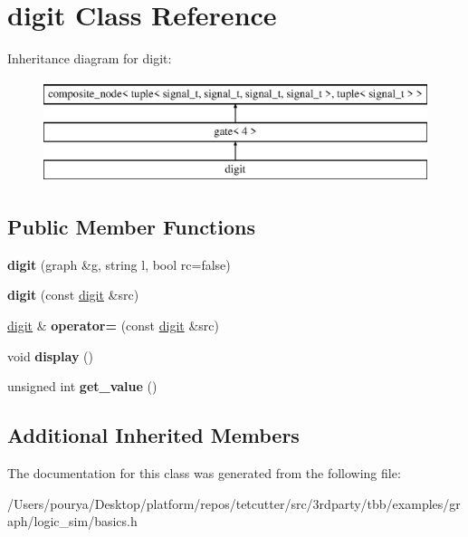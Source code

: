 \hypertarget{classdigit}{}\section{digit Class Reference}
\label{classdigit}
Inheritance diagram for digit\+:\begin{figure}[H]
\begin{center}
\leavevmode
\includegraphics[height=3.000000cm]{classdigit}
\end{center}
\end{figure}
\subsection*{Public Member Functions}
\begin{DoxyCompactItemize}
\item 
\hypertarget{classdigit_a689e30221c7eae6be4c044375d0c1164}{}{\bfseries digit} (graph \&g, string l, bool rc=false)\label{classdigit_a689e30221c7eae6be4c044375d0c1164}

\item 
\hypertarget{classdigit_ab341bade793ad14c1ccc996d095217fe}{}{\bfseries digit} (const \hyperlink{classdigit}{digit} \&src)\label{classdigit_ab341bade793ad14c1ccc996d095217fe}

\item 
\hypertarget{classdigit_af2720ef1255cc2ea17a3ad49184a9e5f}{}\hyperlink{classdigit}{digit} \& {\bfseries operator=} (const \hyperlink{classdigit}{digit} \&src)\label{classdigit_af2720ef1255cc2ea17a3ad49184a9e5f}

\item 
\hypertarget{classdigit_af516c63da92d0ae6c0a9f56349cc4f28}{}void {\bfseries display} ()\label{classdigit_af516c63da92d0ae6c0a9f56349cc4f28}

\item 
\hypertarget{classdigit_a6b46fc4ce30513c3ede33bd29eda8a2f}{}unsigned int {\bfseries get\+\_\+value} ()\label{classdigit_a6b46fc4ce30513c3ede33bd29eda8a2f}

\end{DoxyCompactItemize}
\subsection*{Additional Inherited Members}


The documentation for this class was generated from the following file\+:\begin{DoxyCompactItemize}
\item 
/\+Users/pourya/\+Desktop/platform/repos/tetcutter/src/3rdparty/tbb/examples/graph/logic\+\_\+sim/basics.\+h\end{DoxyCompactItemize}
